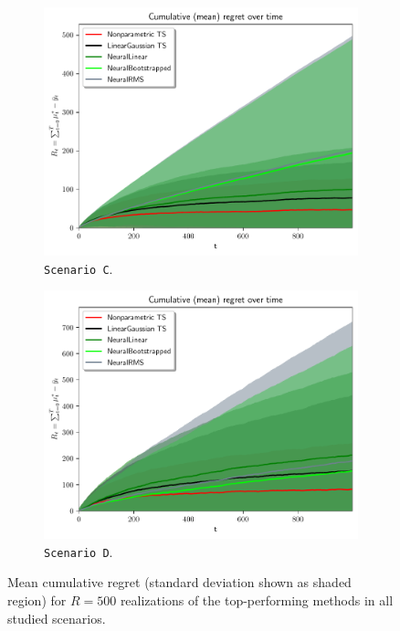 \begin{figure}[!ht]
	\begin{subfigure}[c]{0.45\textwidth}
		\includegraphics[width=\textwidth]{./figs/linear_gaussian_mixture_unbalanced_baselines/cum_optexpected_regret_top_five_std}
		\vspace*{-5ex}
		\caption{\texttt{Scenario C}.}
		\label{fig:scenario_C_baselines_top}
	\end{subfigure}
	\begin{subfigure}[c]{0.45\textwidth}
		\includegraphics[width=\textwidth]{./figs/linear_gaussian_mixture_heavy_tail_baselines/cum_optexpected_regret_top_five_std}
		\vspace*{-5ex}
		\caption{\texttt{Scenario D}.}
		\label{fig:scenario_D_baselines_top}
	\end{subfigure}
	\vspace*{-2ex}
	\caption{Mean cumulative regret (standard deviation shown as shaded region) for $R=500$ realizations of the top-performing methods in all studied scenarios.}
	\label{fig:mixture_scenarios_bandit_showdown_baselines}
\end{figure}

